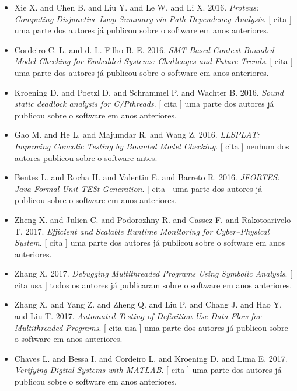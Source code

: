 \begin{itemize}
      [
          cita
          usa
      ]
uma parte dos autores já publicou sobre o software em anos anteriores.
\item Xie X. and Chen B. and Liu Y. and Le W. and Li X.
      2016.
        \textit{ Proteus: Computing Disjunctive Loop Summary via Path Dependency Analysis}.
      [
          cita
      ]
uma parte dos autores já publicou sobre o software em anos anteriores.
\item Cordeiro C. L. and d. L. Filho B. E.
      2016.
        \textit{ SMT-Based Context-Bounded Model Checking for Embedded Systems: Challenges and Future Trends}.
      [
          cita
      ]
uma parte dos autores já publicou sobre o software em anos anteriores.
\item Kroening D. and Poetzl D. and Schrammel P. and Wachter B.
      2016.
        \textit{ Sound static deadlock analysis for C/Pthreads}.
      [
          cita
      ]
uma parte dos autores já publicou sobre o software em anos anteriores.
\item Gao M. and He L. and Majumdar R. and Wang Z.
      2016.
        \textit{ LLSPLAT: Improving Concolic Testing by Bounded Model Checking}.
      [
          cita
      ]
nenhum dos autores publicou sobre o software antes.
\item Bentes L. and Rocha H. and Valentin E. and Barreto R.
      2016.
        \textit{ JFORTES: Java Formal Unit TESt Generation}.
      [
          cita
      ]
uma parte dos autores já publicou sobre o software em anos anteriores.
\item Zheng X. and Julien C. and Podorozhny R. and Cassez F. and Rakotoarivelo T.
      2017.
        \textit{ Efficient and Scalable Runtime Monitoring for Cyber--Physical System}.
      [
          cita
      ]
uma parte dos autores já publicou sobre o software em anos anteriores.
\item Zhang X.
      2017.
        \textit{ Debugging Multithreaded Programs Using Symbolic Analysis}.
      [
          cita
          usa
      ]
todos os autores já publicaram sobre o software em anos anteriores.
\item Zhang X. and Yang Z. and Zheng Q. and Liu P. and Chang J. and Hao Y. and Liu T.
      2017.
        \textit{ Automated Testing of Definition-Use Data Flow for Multithreaded Programs}.
      [
          cita
          usa
      ]
uma parte dos autores já publicou sobre o software em anos anteriores.
\item Chaves L. and Bessa I. and Cordeiro L. and Kroening D. and Lima E.
      2017.
        \textit{ Verifying Digital Systems with MATLAB}.
      [
          cita
      ]
uma parte dos autores já publicou sobre o software em anos anteriores.
\end{itemize}
